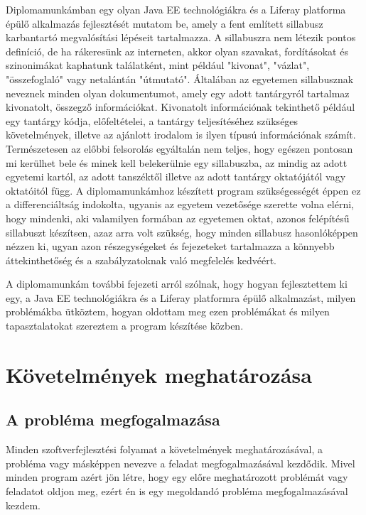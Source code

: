 \documentclass[hidelinks, 12pt, a4paper]{report}
\begin{document}
Diplomamunkámban egy olyan Java EE technológiákra és a Liferay platforma épülő alkalmazás fejlesztését mutatom be, amely a fent említett sillabusz karbantartó megvalósítási lépéseit tartalmazza. A sillabuszra \cite{sillabusz} nem létezik pontos definíció, de ha rákeresünk az interneten, akkor olyan szavakat, fordításokat és szinonimákat kaphatunk találatként, mint például "kivonat", "vázlat", "összefoglaló" vagy netalántán "útmutató". Általában az egyetemen sillabusznak neveznek minden olyan dokumentumot, amely egy adott tantárgyról tartalmaz kivonatolt, összegző információkat. Kivonatolt információnak tekinthető például egy tantárgy kódja, előfeltételei, a tantárgy teljesítéséhez szükséges követelmények, illetve az ajánlott irodalom is ilyen típusú információnak számít. Természetesen az előbbi felsorolás egyáltalán nem teljes, hogy egészen pontosan mi kerülhet bele és minek kell belekerülnie egy sillabuszba, az mindig az adott egyetemi kartól, az adott tanszéktől illetve az adott tantárgy oktatójától vagy oktatóitól függ. A diplomamunkámhoz készített program szükségességét éppen ez a differenciáltság indokolta, ugyanis az egyetem vezetősége szerette volna elérni, hogy mindenki, aki valamilyen formában az egyetemen oktat, azonos felépítésű sillabuszt készítsen, azaz arra volt szükség, hogy minden sillabusz hasonlóképpen nézzen ki, ugyan azon részegységeket és fejezeteket tartalmazza a könnyebb áttekinthetőség és a szabályzatoknak való megfelelés kedvéért.

A diplomamunkám további fejezeti arról szólnak, hogy hogyan fejlesztettem ki egy, a Java EE technológiákra és a Liferay platformra épülő alkalmazást, milyen problémákba ütköztem, hogyan oldottam meg ezen problémákat és milyen tapasztalatokat szereztem a program készítése közben.

\chapter{Követelmények meghatározása}

\section{A probléma megfogalmazása}

Minden szoftverfejlesztési folyamat a követelmények meghatározásával, a probléma vagy másképpen nevezve a feladat megfogalmazásával kezdődik. Mivel minden program azért jön létre, hogy egy előre meghatározott problémát vagy feladatot oldjon meg, ezért én is egy megoldandó probléma megfogalmazásával kezdem.
\end{document}

